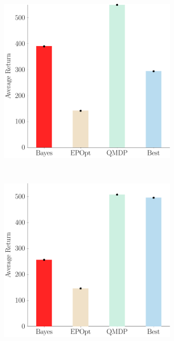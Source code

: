 \documentclass{article}
\begin{document}
\newpage
\begin{figure}[t!]
\begin{centering}
\begin{subfigure}[b]{0.38\columnwidth}
\includegraphics[width=\linewidth]{figs/cheetah_nominal_comparison.pdf}
\end{subfigure}
~
\begin{subfigure}[b]{0.38\columnwidth}
\includegraphics[width=\linewidth]{figs/cheetah_env_comparison.pdf}

\end{subfigure}
\end{centering}
\end{figure}
\end{document}
